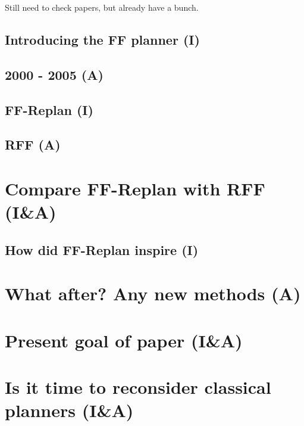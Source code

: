 \documentclass[runningheads,a4paper]{llncs}
\begin{document}
Still need to check papers, but already have a bunch.


\subsection{Introducing the FF planner (I)}

\subsection{2000 - 2005 (A)}

\subsection{FF-Replan (I)}

\subsection{RFF (A)}

\section{Compare FF-Replan with RFF (I\&A)}

\subsection{How did FF-Replan inspire (I)}

\section{What after? Any new methods (A)}

\section{Present goal of paper (I\&A)}

\section{Is it time to reconsider classical planners (I\&A)}



\end{document}
